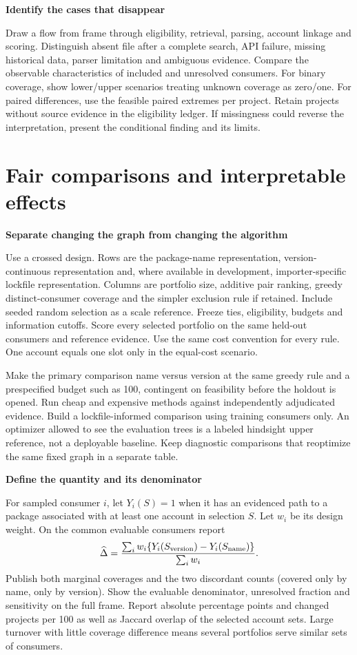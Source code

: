 \documentclass[11pt,a4paper]{article}
\newcommand{\pg}[1]{\newpage\section{\color{ink}#1}}
\newcommand{\hd}[1]{\par\textbf{\color{accent}#1}\par\nopagebreak}
\begin{document}
\hd{Identify the cases that disappear}
Draw a flow from frame through eligibility, retrieval, parsing, account linkage and scoring. Distinguish absent file after a complete search, API failure, missing historical data, parser limitation and ambiguous evidence. Compare the observable characteristics of included and unresolved consumers. For binary coverage, show lower/upper scenarios treating unknown coverage as zero/one. For paired differences, use the feasible paired extremes per project. Retain projects without source evidence in the eligibility ledger. If missingness could reverse the interpretation, present the conditional finding and its limits.

\pg{Fair comparisons and interpretable effects}
\hd{Separate changing the graph from changing the algorithm}
Use a crossed design. Rows are the package-name representation, version-continuous representation and, where available in development, importer-specific lockfile representation. Columns are portfolio size, additive pair ranking, greedy distinct-consumer coverage and the simpler exclusion rule if retained. Include seeded random selection as a scale reference. Freeze ties, eligibility, budgets and information cutoffs. Score every selected portfolio on the same held-out consumers and reference evidence. Use the same cost convention for every rule. One account equals one slot only in the equal-cost scenario.

Make the primary comparison name versus version at the same greedy rule and a prespecified budget such as 100, contingent on feasibility before the holdout is opened. Run cheap and expensive methods against independently adjudicated evidence. Build a lockfile-informed comparison using training consumers only. An optimizer allowed to see the evaluation trees is a labeled hindsight upper reference, not a deployable baseline. Keep diagnostic comparisons that reoptimize the same fixed graph in a separate table.

\hd{Define the quantity and its denominator}
For sampled consumer $i$, let $Y_i(S)=1$ when it has an evidenced path to a package associated with at least one account in selection $S$. Let $w_i$ be its design weight. On the common evaluable consumers report
\[
 \widehat{\Delta}=\frac{\sum_i w_i\{Y_i(S_{\rm version})-Y_i(S_{\rm name})\}}{\sum_i w_i}.
\]
Publish both marginal coverages and the two discordant counts (covered only by name, only by version). Show the evaluable denominator, unresolved fraction and sensitivity on the full frame. Report absolute percentage points and changed projects per 100 as well as Jaccard overlap of the selected account sets. Large turnover with little coverage difference means several portfolios serve similar sets of consumers.
\end{document}
